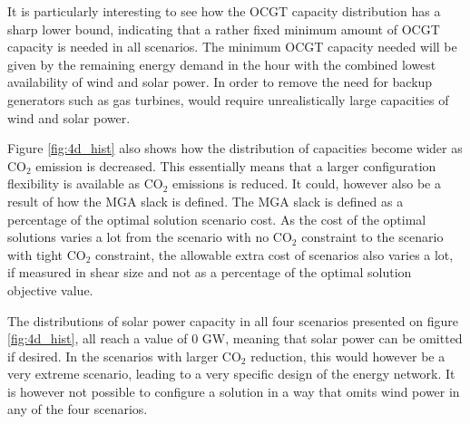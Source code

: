 It is particularly interesting to see how the OCGT capacity distribution has a sharp lower bound, indicating that a rather fixed minimum amount of OCGT capacity is needed in all scenarios. The minimum OCGT capacity needed will be given by the remaining energy demand in the hour with the combined lowest availability of wind and solar power. In order to remove the need for backup generators such as gas turbines, would require unrealistically large capacities of wind and solar power. 

Figure \ref{fig:4d_hist} also shows how the distribution of capacities become wider as $\text{CO}_2$ emission is decreased. This essentially means that a larger configuration flexibility is available as $\text{CO}_2$ emissions is reduced. It could, however also be a result of how the MGA slack is defined. The MGA slack is defined as a percentage of the optimal solution scenario cost. As the cost of the optimal solutions varies a lot from the scenario with no $\text{CO}_2$ constraint to the scenario with tight $\text{CO}_2$ constraint, the allowable extra cost of scenarios also varies a lot, if measured in shear size and not as a percentage of the optimal solution objective value.

The distributions of solar power capacity in all four scenarios presented on figure \ref{fig:4d_hist}, all reach a value of 0 GW, meaning that solar power can be omitted if desired. In the scenarios with larger $\text{CO}_2$ reduction, this would however be a very extreme scenario, leading to a very specific design of the energy network. It is however not possible to configure a solution in a way that omits wind power in any of the four scenarios. 


